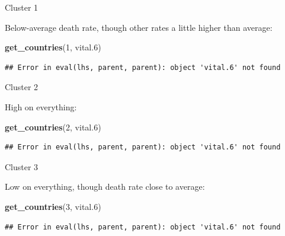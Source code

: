 \documentclass[ignorenonframetext,]{beamer}
\newenvironment{Shaded}{\begin{snugshade}}{\end{snugshade}}
\newcommand{\DecValTok}[1]{\textcolor[rgb]{0.00,0.00,0.81}{#1}}
\newcommand{\FloatTok}[1]{\textcolor[rgb]{0.00,0.00,0.81}{#1}}
\newcommand{\KeywordTok}[1]{\textcolor[rgb]{0.13,0.29,0.53}{\textbf{#1}}}
\newcommand{\NormalTok}[1]{#1}
\begin{document}
\begin{frame}[fragile]{Cluster 1}
\protect\hypertarget{cluster-1-1}{}

Below-average death rate, though other rates a little higher than
average:

\begin{Shaded}
\begin{Highlighting}[]
\KeywordTok{get_countries}\NormalTok{(}\DecValTok{1}\NormalTok{, vital}\FloatTok{.6}\NormalTok{)}
\end{Highlighting}
\end{Shaded}

\begin{verbatim}
## Error in eval(lhs, parent, parent): object 'vital.6' not found
\end{verbatim}

\end{frame}

\begin{frame}[fragile]{Cluster 2}
\protect\hypertarget{cluster-2}{}

High on everything:

\begin{Shaded}
\begin{Highlighting}[]
\KeywordTok{get_countries}\NormalTok{(}\DecValTok{2}\NormalTok{, vital}\FloatTok{.6}\NormalTok{)}
\end{Highlighting}
\end{Shaded}

\begin{verbatim}
## Error in eval(lhs, parent, parent): object 'vital.6' not found
\end{verbatim}

\end{frame}

\begin{frame}[fragile]{Cluster 3}
\protect\hypertarget{cluster-3-1}{}

Low on everything, though death rate close to average:

\begin{Shaded}
\begin{Highlighting}[]
\KeywordTok{get_countries}\NormalTok{(}\DecValTok{3}\NormalTok{, vital}\FloatTok{.6}\NormalTok{)}
\end{Highlighting}
\end{Shaded}

\begin{verbatim}
## Error in eval(lhs, parent, parent): object 'vital.6' not found
\end{verbatim}

\end{frame}
\end{document}
